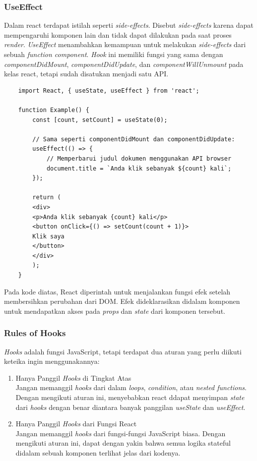 


\subsubsection{UseEffect}
Dalam react terdapat istilah seperti \textit{side-effects}. Disebut \textit{side-effects} karena dapat mempengaruhi komponen lain dan tidak dapat dilakukan pada saat proses \textit{render}.
\textit{UseEffect} menambahkan kemampuan untuk melakukan \textit{side-effects} dari sebuah \textit{function component}. \textit{Hook} ini memiliki fungsi yang sama dengan \textit{componentDidMount}, \textit{componentDidUpdate}, dan \textit{componentWillUnmount} pada kelas react, tetapi sudah disatukan menjadi satu API. 
\begin{lstlisting}
	import React, { useState, useEffect } from 'react';
	
	function Example() {
		const [count, setCount] = useState(0);
		
		// Sama seperti componentDidMount dan componentDidUpdate:
		useEffect(() => {
			// Memperbarui judul dokumen menggunakan API browser
			document.title = `Anda klik sebanyak ${count} kali`;
		});
		
		return (
		<div>
		<p>Anda klik sebanyak {count} kali</p>
		<button onClick={() => setCount(count + 1)}>
		Klik saya
		</button>
		</div>
		);
	}
\end{lstlisting} 
Pada kode diatas, React diperintah untuk menjalankan fungsi efek setelah membersihkan perubahan dari DOM. Efek dideklarasikan didalam komponen untuk mendapatkan akses pada \textit{props} dan \textit{state} dari komponen tersebut.


\subsubsection{Rules of Hooks}
\textit{Hooks} adalah fungsi JavaScript, tetapi terdapat dua aturan yang perlu diikuti keteika ingin menggunakannya:
\begin{enumerate}
	\item Hanya Panggil \textit{Hooks} di Tingkat Atas\\
	Jangan memanggil \textit{hooks} dari dalam \textit{loops}, \textit{condition}, atau \textit{nested functions}. Dengan mengikuti aturan ini, menyebabkan react ddapat menyimpan \textit{state} dari \textit{hooks} dengan benar diantara banyak panggilan \textit{useState} dan \textit{useEffect}.
	
	\item Hanya Panggil \textit{Hooks} dari Fungsi React\\
	Jangan memanggil \textit{hooks} dari fungsi-fungsi JavaScript biasa. Dengan mengikuti aturan ini, dapat dengan yakin bahwa semua logika stateful didalam sebuah komponen terlihat jelas dari kodenya.
\end{enumerate}

